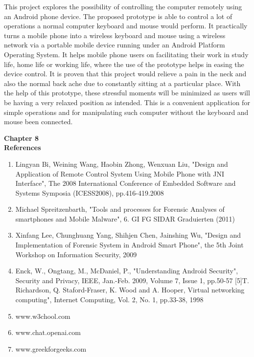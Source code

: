 \documentclass[12pt]{article}
\begin{document}
This project explores the possibility of controlling the computer remotely using
an Android phone device. The proposed prototype is able to control a lot of
operations a normal computer keyboard and mouse would perform. It
practically turns a mobile phone into a wireless keyboard and mouse using a
wireless network via a portable mobile device running under an Android
Platform Operating System. It helps mobile phone users on facilitating their
work in study life, home life or working life, where the use of the prototype
helps in easing the device control. It is proven that this project would relieve a
pain in the neck and also the normal back ache due to constantly sitting at a
particular place. With the help of this prototype, these stressful moments will
be minimized as users will be having a very relaxed position as intended. This is
a convenient application for simple operations and for manipulating such
computer without the keyboard and mouse been connected.


\clearpage

\begin{center}
\LARGE \textbf {Chapter 8 }\\[5mm]
\LARGE \textbf{References }\\[5mm]
\end{center}

\begin{enumerate}

\item  Lingyan Bi, Weining Wang, Haobin Zhong, Wenxuan Liu, "Design and 
Application of Remote Control System Using Mobile Phone with JNI Interface", The 
2008 International Conference of Embedded Software and Systems Symposia 
(ICESS2008), pp.416-419.2008 

\item Michael Spreitzenbarth, "Tools and processes for Forensic Analyses of 
smartphones and Mobile Malware", 6. GI FG SIDAR Graduierten 
(2011)

\item Xinfang Lee, Chunghuang Yang, Shihjen Chen, Jainshing Wu, "Design and 
Implementation of Forensic System in Android Smart Phone", the 5th Joint 
Workshop on Information Security, 2009 

\item Enck, W., Ongtang, M., McDaniel, P., "Understanding Android Security", Security 
and Privacy, IEEE, Jan.-Feb. 2009, Volume 7, Issue 1, pp.50-57 [5]T. Richardson, Q. 
Staford-Fraser, K. Wood and A. Hooper, Virtual networking computing", Internet 
Computing, Vol. 2, No. 1, pp.33-38, 1998 

\item  www.w3chool.com

\item  www.chat.openai.com

\item www.greekforgeeks.com

\end{enumerate}


 
\end{document}
